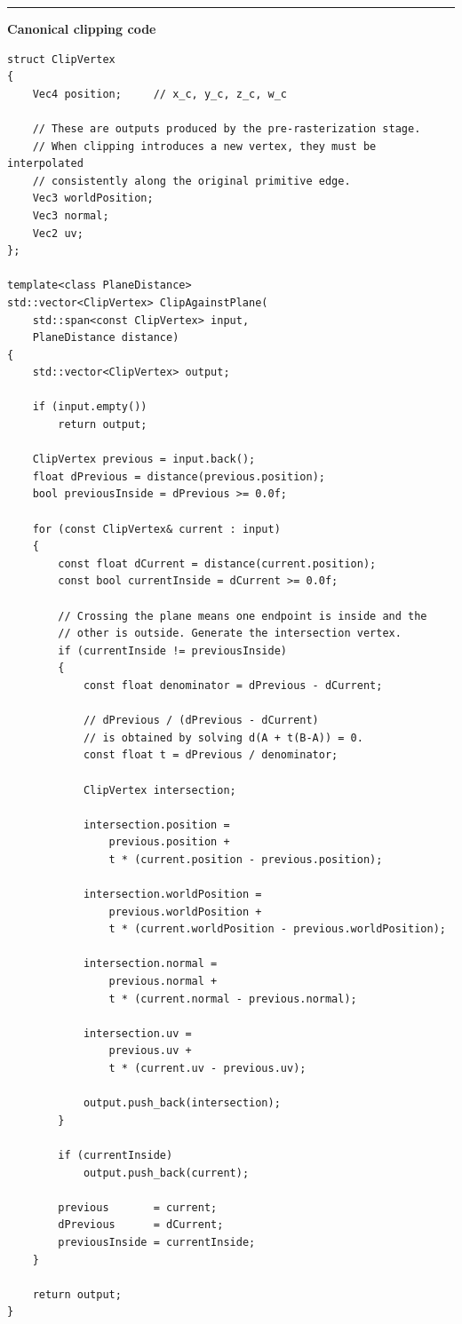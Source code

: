 \begin{center}\rule{0.5\linewidth}{0.5pt}\end{center}

\textbf{Canonical clipping code}

\begin{verbatim}
struct ClipVertex
{
    Vec4 position;     // x_c, y_c, z_c, w_c

    // These are outputs produced by the pre-rasterization stage.
    // When clipping introduces a new vertex, they must be interpolated
    // consistently along the original primitive edge.
    Vec3 worldPosition;
    Vec3 normal;
    Vec2 uv;
};

template<class PlaneDistance>
std::vector<ClipVertex> ClipAgainstPlane(
    std::span<const ClipVertex> input,
    PlaneDistance distance)
{
    std::vector<ClipVertex> output;

    if (input.empty())
        return output;

    ClipVertex previous = input.back();
    float dPrevious = distance(previous.position);
    bool previousInside = dPrevious >= 0.0f;

    for (const ClipVertex& current : input)
    {
        const float dCurrent = distance(current.position);
        const bool currentInside = dCurrent >= 0.0f;

        // Crossing the plane means one endpoint is inside and the
        // other is outside. Generate the intersection vertex.
        if (currentInside != previousInside)
        {
            const float denominator = dPrevious - dCurrent;

            // dPrevious / (dPrevious - dCurrent)
            // is obtained by solving d(A + t(B-A)) = 0.
            const float t = dPrevious / denominator;

            ClipVertex intersection;

            intersection.position =
                previous.position +
                t * (current.position - previous.position);

            intersection.worldPosition =
                previous.worldPosition +
                t * (current.worldPosition - previous.worldPosition);

            intersection.normal =
                previous.normal +
                t * (current.normal - previous.normal);

            intersection.uv =
                previous.uv +
                t * (current.uv - previous.uv);

            output.push_back(intersection);
        }

        if (currentInside)
            output.push_back(current);

        previous       = current;
        dPrevious      = dCurrent;
        previousInside = currentInside;
    }

    return output;
}
\end{verbatim}

